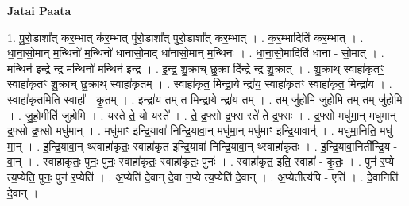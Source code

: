 \documentclass[17pt]{extarticle}
\begin{document}
\textbf{Jatai Paata} \newline

1. पु॒रो॒डाशा᳚त् कर॒म्भात् क॑र॒म्भात् पु॑रो॒डाशा᳚त् पुरो॒डाशा᳚त् कर॒म्भात् । . क॒र॒म्भादिति॑ कर॒म्भात् । . धा॒ना॒सो॒मान् म॒न्थिनो॑ म॒न्थिनो॑ धानासो॒माद् धा॑नासो॒मान् म॒न्थिनः॑ । . धा॒ना॒सो॒मादिति॑ धाना - सो॒मात् । . म॒न्थिन॑ इन्द्रे न्द्र म॒न्थिनो॑ म॒न्थिन॑ इन्द्र । . इ॒न्द्र॒ शु॒क्राच् छु॒क्रा दि॑न्द्रे न्द्र शु॒क्रात् । . शु॒क्राथ् स्वाहा॑कृतꣳ॒॒ स्वाहा॑कृतꣳ शु॒क्राच् छु॒क्राथ् स्वाहा॑कृतम् । . स्वाहा॑कृत॒ मिन्द्रा॒ये न्द्रा॑य॒ स्वाहा॑कृतꣳ॒॒ स्वाहा॑कृत॒ मिन्द्रा॑य । . स्वाहा॑कृत॒मिति॒ स्वाहा᳚ - कृ॒त॒म् । . इन्द्रा॑य॒ तम् त मिन्द्रा॒ये न्द्रा॑य॒ तम् । . तम् जु॑होमि जुहोमि॒ तम् तम् जु॑होमि । . जु॒हो॒मीति॑ जुहोमि । . यस्ते॑ ते॒ यो यस्ते᳚ । . ते॒ द्र॒फ्सो द्र॒फ्स स्ते॑ ते द्र॒फ्सः । . द्र॒फ्सो मधु॑मा॒न् मधु॑मान् द्र॒फ्सो द्र॒फ्सो मधु॑मान् । . मधु॑माꣳ इन्द्रि॒यावा॑ निन्द्रि॒यावा॒न् मधु॑मा॒न् मधु॑माꣳ इन्द्रि॒यावान्॑ । . मधु॑मा॒निति॒ मधु॑ - मा॒न् । . इ॒न्द्रि॒यावा॒न् थ्स्वाहा॑कृतः॒ स्वाहा॑कृत इन्द्रि॒यावा॑ निन्द्रि॒यावा॒न् थ्स्वाहा॑कृतः । . इ॒न्द्रि॒यावा॒निती᳚न्द्रि॒य - वा॒न् । . स्वाहा॑कृतः॒ पुनः॒ पुनः॒ स्वाहा॑कृतः॒ स्वाहा॑कृतः॒ पुनः॑ । . स्वाहा॑कृत॒ इति॒ स्वाहा᳚ - कृ॒तः॒ । . पुन॑ र॒प्ये त्य॒प्येति॒ पुनः॒ पुन॑ र॒प्येति॑ । . अ॒प्येति॑ दे॒वान् दे॒वा न॒प्ये त्य॒प्येति॑ दे॒वान् । . अ॒प्येतीत्य॑पि - एति॑ । . दे॒वानिति॑ दे॒वान् । \newline
\end{document}
